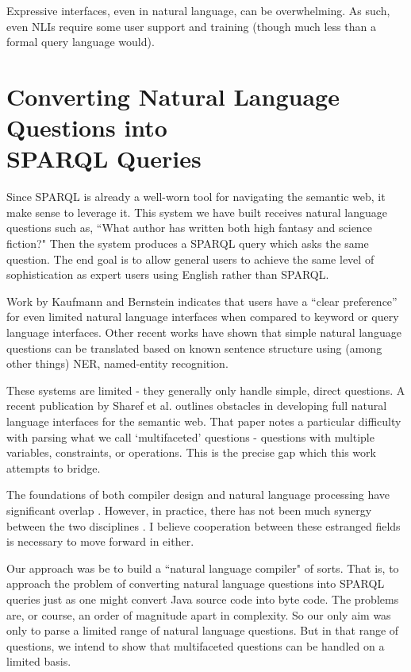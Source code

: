 \documentclass[11pt]{article}
\begin{document}
Expressive interfaces, even in natural language, can be overwhelming.
As such, even NLIs require some user support and training (though much less than
a formal query language would). \cite{usability}


\section{Converting Natural Language Questions into \\SPARQL Queries}
Since SPARQL is already a well-worn tool for navigating the semantic
web, it make sense to leverage it. This system we have built receives natural language
questions such as, ``What author has written both high fantasy and science fiction?"
Then the system produces a SPARQL query which asks the same question. 
The end goal is to allow general users to achieve the same level of sophistication
as expert users using English rather than SPARQL.

Work by Kaufmann and Bernstein \cite{usability} indicates
that users have a “clear preference” for even limited natural language interfaces
when compared to keyword or query language interfaces.
Other recent works \cite{mapping, freya, galitsky}
have shown that simple natural language questions can be translated based
on known sentence structure using (among other things) NER, named-entity recognition.

These systems are limited - they generally only handle simple, direct questions.
A recent publication by Sharef et al. \cite{issues} outlines obstacles in developing full
natural language interfaces for the semantic web. That paper notes a particular
difficulty with parsing what we call `multifaceted' questions - questions with multiple
variables, constraints, or operations. This is the precise gap which this work
attempts to bridge.

The foundations of both compiler design and natural language processing
have significant overlap \cite{chomsky, reghizzi}.
However, in practice, there has not been
much synergy between the two disciplines \cite{aho, anatomy, reghizzi}.
I believe cooperation between these estranged fields is necessary to move forward
in either.

Our approach was be to build a ``natural language compiler" of sorts.
That is, to approach the problem of converting natural language questions into
SPARQL queries just as one might convert Java source code into byte code.
The problems are, or course, an order of magnitude apart in complexity.
So our only aim was only to parse a limited range of natural language questions.
But in that range of questions, we intend to show that multifaceted questions
can be handled on a limited basis.
\end{document}
